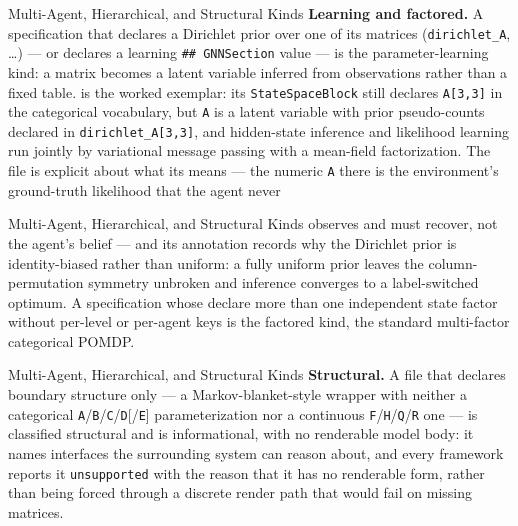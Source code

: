 \documentclass[
  ignorenonframetext,
]{beamer}
\begin{document}
\begin{frame}{Multi-Agent, Hierarchical, and
Structural Kinds}
\textbf{Learning and factored.} A specification that declares a
Dirichlet prior over one of its matrices (\texttt{dirichlet\_A}, \ldots)
--- or declares a learning \texttt{\#\#\ GNNSection} value --- is the
parameter-learning kind: a matrix becomes a latent variable inferred
from observations rather than a fixed table.
 is
the worked exemplar: its \texttt{StateSpaceBlock} still declares
\texttt{A{[}3,3{]}} in the categorical vocabulary, but \texttt{A} is a
latent variable with prior pseudo-counts declared in
\texttt{dirichlet\_A{[}3,3{]}}, and hidden-state inference and
likelihood learning run jointly by variational message passing with a
mean-field factorization. The file is explicit about what its
 means --- the numeric \texttt{A} there
is the environment's ground-truth likelihood that the agent never
\end{frame}

\begin{frame}{Multi-Agent, Hierarchical, and
Structural Kinds}
observes and must recover, not the agent's belief --- and its annotation
records why the Dirichlet prior is identity-biased rather than uniform:
a fully uniform prior leaves the column-permutation symmetry unbroken
and inference converges to a label-switched optimum. A specification
whose  declare more than one independent
state factor without per-level or per-agent keys is the factored kind,
the standard multi-factor categorical POMDP.

\end{frame}

\begin{frame}{Multi-Agent, Hierarchical, and
Structural Kinds}
\textbf{Structural.} A file that declares boundary structure only --- a
Markov-blanket-style wrapper with neither a categorical
\texttt{A}/\texttt{B}/\texttt{C}/\texttt{D}{[}/\texttt{E}{]}
parameterization nor a continuous
\texttt{F}/\texttt{H}/\texttt{Q}/\texttt{R} one --- is classified
structural and is informational, with no renderable model body: it names
interfaces the surrounding system can reason about, and every framework
reports it \texttt{unsupported} with the reason that it has no
renderable form, rather than being forced through a discrete render path
that would fail on missing matrices.

\end{frame}
\end{document}
